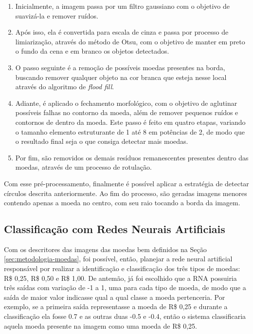 \documentclass[10pt,journal]{IEEEtran}
\begin{document}
\begin{enumerate}

\item Inicialmente, a imagem passa por um filtro gaussiano com o objetivo de suavizá-la e remover ruídos.
\item Após isso, ela é convertida para escala de cinza e passa por processo de limiarização, através do método de Otsu, com o objetivo de manter em preto o fundo da cena e em branco os objetos detectados.
\item O passo seguinte é a remoção de possíveis moedas presentes na borda, buscando remover qualquer objeto na cor branca que esteja nesse local através do algoritmo de \textit{flood fill}.
\item Adiante, é aplicado o fechamento morfológico, com o objetivo de aglutinar possíveis falhas no contorno da moeda, além de remover pequenos ruídos e contornos de dentro da moeda. Este passo é feito em quatro etapas, variando o tamanho elemento estruturante de 1 até 8 em potências de 2, de modo que o resultado final seja o que consiga detectar mais moedas.
\item Por fim, são removidos os demais resíduos remanescentes presentes dentro das moedas, através de um processo de rotulação. 
\end{enumerate}

Com esse pré-processamento, finalmente é possível aplicar a estratégia de detectar círculos descrita anteriormente. Ao fim do processo, são geradas imagens menores contendo apenas a moeda no centro, com seu raio tocando a borda da imagem.

\subsection{Classificação com Redes Neurais Artificiais}
\label{sec:metodologia-rna}


Com os descritores das imagens das moedas bem definidos na Seção \ref{sec:metodologia-moedas}, foi possível, então, planejar a rede neural artificial responsável por realizar a identificação e classificação dos três tipos de moedas: R\$ 0,25, R\$ 0,50 e R\$ 1,00. De antemão, já foi escolhido que a RNA possuiria três saídas com variação de -1 a 1, uma para cada tipo de moeda, de modo que a saída de maior valor indicasse qual a qual classe a moeda pertenceria. Por exemplo, se a primeira saída representasse a moeda de R\$ 0,25 e durante a classificação ela fosse 0.7 e as outras duas -0.5 e -0.4, então o sistema classificaria aquela moeda presente na imagem como uma moeda de R\$ 0,25.
\end{document}
